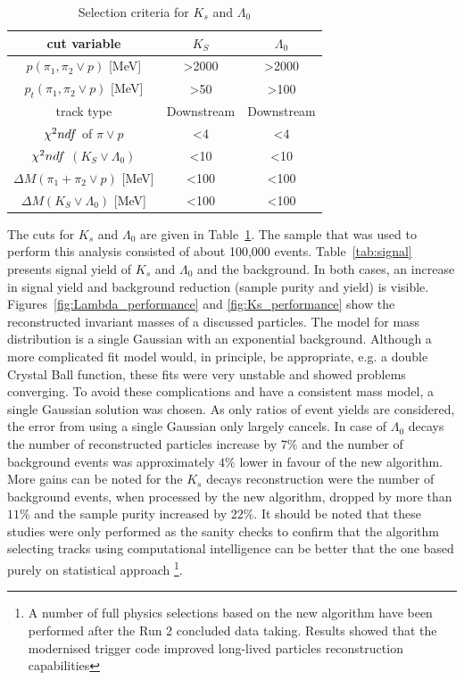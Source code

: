  
\begin{table}[h]
\centering
\caption{Selection criteria for $K_s$ and $\Lambda_0$ }
\begin{tabular}{|c|c|c|}
\hline
cut variable                                  & $K_S$              & $\Lambda_0$        \\ \hline
$p(\pi_1, \pi_2 \lor p)$ {[}MeV{]}              & \textgreater{}2000 & \textgreater{}2000 \\ \hline
$p_t(\pi_1, \pi_2 \lor p)$ {[}MeV{]}            & \textgreater{}50   & \textgreater{}100  \\ \hline
track type                               & Downstream         & Downstream         \\ \hline
$\chi^2\/ndf$ of $\pi \lor p$              & \textless{}4       & \textless{}4       \\ \hline
$\chi^2\/ndf$ $(K_S \lor \Lambda_0)$       & \textless{}10      & \textless{}10      \\ \hline
$\Delta M(\pi_1 + \pi_2 \lor p)$ {[}MeV{]} & \textless{}100     & \textless{}100     \\ \hline
$\Delta M(K_S \lor \Lambda_0)$ {[}MeV{]}   & \textless{}100     & \textless{}100     \\ \hline
\end{tabular}
\label{tab:cuts}
\end{table}
 
 
 The cuts for $K_s$ and $\Lambda_0$ are given in Table~\ref{tab:cuts}. The sample that was used to perform this analysis consisted of about 100,000 events. Table~\ref{tab:signal} presents signal yield of $K_s$ and $\Lambda_0$ and the background. In both cases, an increase in signal yield and background reduction (sample purity and yield) is visible. Figures~\ref{fig:Lambda_performance} and \ref{fig:Ks_performance} show the reconstructed invariant masses of a discussed particles. The model for mass distribution is a single Gaussian with an exponential background. Although a more complicated fit model would, in principle, be appropriate, e.g. a double Crystal Ball function, these fits were very unstable and showed problems converging. To avoid these complications and have a consistent mass model, a single Gaussian solution was chosen. As only ratios of event yields are considered, the error from using a single Gaussian only largely cancels. 
 In case of $\Lambda_{0}$ decays the number of reconstructed particles increase by $7\%$
 and the number of background events was approximately $4\%$ lower in favour of the new algorithm. More gains can be noted for the $K_{s}$ decays reconstruction were the number of background events, when processed by the new algorithm, dropped by more than $11\%$
 and the sample purity increased by $22\%$. It should be noted that these studies were only performed as the sanity checks to confirm that the algorithm selecting tracks using computational intelligence can be better that the one based purely on statistical approach \footnote{A number of full physics selections based on the new algorithm have been performed after the Run 2 concluded data taking. Results showed that the modernised trigger code improved long-lived particles reconstruction capabilities}. 

